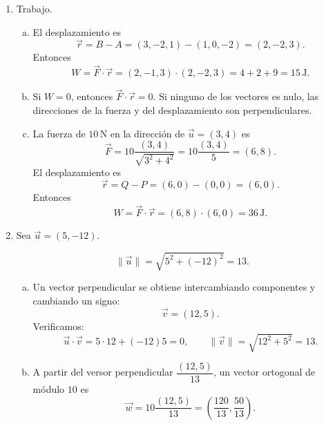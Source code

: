 \begin{enumerate}[\hspace{-3mm}$1)$]
\item Trabajo.
\begin{sol}
\begin{enumerate}[a)]
\item El desplazamiento es
\[
\vec r=B-A=(3,-2,1)-(1,0,-2)=(2,-2,3).
\]
Entonces
\[
W=\vec F\cdot\vec r=(2,-1,3)\cdot(2,-2,3)=4+2+9=15\,\text{J}.
\]
\item Si $W=0$, entonces $\vec F\cdot\vec r=0$. Si ninguno de los vectores es nulo, las direcciones de la fuerza y del desplazamiento son perpendiculares.
\item La fuerza de $10\,\text{N}$ en la dirección de $\vec u=(3,4)$ es
\[
\vec F=10\frac{(3,4)}{\sqrt{3^2+4^2}}=10\frac{(3,4)}5=(6,8).
\]
El desplazamiento es
\[
\vec r=Q-P=(6,0)-(0,0)=(6,0).
\]
Entonces
\[
W=\vec F\cdot\vec r=(6,8)\cdot(6,0)=36\,\text{J}.
\]
\end{enumerate}
\end{sol}

\item Sea $\vec u=(5,-12)$.
\begin{sol}
\[
\|\vec u\|=\sqrt{5^2+(-12)^2}=13.
\]
\begin{enumerate}[a)]
\item Un vector perpendicular se obtiene intercambiando componentes y cambiando un signo:
\[
\vec v=(12,5).
\]
Verificamos:
\[
\vec u\cdot\vec v=5\cdot12+(-12)5=0,\qquad \|\vec v\|=\sqrt{12^2+5^2}=13.
\]
\item A partir del versor perpendicular $\dfrac{(12,5)}{13}$, un vector ortogonal de módulo $10$ es
\[
\vec w=10\frac{(12,5)}{13}=\left(\frac{120}{13},\frac{50}{13}\right).
\]
\end{enumerate}
\begin{center}
\end{center}
\end{sol}


\end{enumerate}
